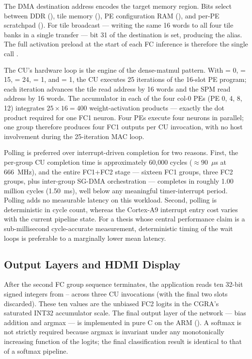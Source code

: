 The DMA destination address encodes the target memory region.
Bits \code{[31:28]} select between DDR (), tile memory
(), PE configuration RAM (), and per-PE scratchpad
(). For tile broadcast --- writing the same 16 words to all
four tile banks in a single transfer --- bit 31 of the destination is
set, producing the  alias. The full
activation preload at the start of each FC inference is therefore the
single call .

The CU's hardware loop is the engine of the dense-matmul pattern.
With  = 0,  = 15,
 = 24,  = 1, and
 = 1, the CU executes 25 iterations of the 16-slot
PE program; each iteration advances the tile read address by 16 words
and the SPM read address by 16 words. The accumulator in each of the
four col-0 PEs (PE 0, 4, 8, 12) integrates
$25 \times 16 = 400$ weight-activation products --- exactly the dot
product required for one FC1 neuron. Four PEs execute four neurons in
parallel; one group therefore produces four FC1 outputs per CU
invocation, with no host involvement during the 25-iteration MAC loop.

Polling is preferred over interrupt-driven completion for two reasons.
First, the per-group CU completion time is approximately 60{,}000 cycles
($\approx 90$~$\mu$s at 666~MHz), and the entire FC1+FC2 stage --- sixteen
FC1 groups, three FC2 groups, plus inter-group SG-DMA orchestration ---
completes in roughly 1.00 million cycles (1.50~ms), well below any
meaningful timer-interrupt period. Polling adds no measurable latency on
this workload. Second, polling is deterministic in cycle count, whereas
the Cortex-A9 interrupt entry cost varies with the current pipeline
state. For a thesis whose central performance claim is a sub-millisecond
cycle-accurate measurement, deterministic timing of the wait loops is
preferable to a marginally lower mean latency.

\subsection{Output Layers and HDMI Display}
\label{ssec:output}

After the second FC group sequence terminates, the application reads
ten 32-bit signed integers from --
across three CU invocations (with the final two slots discarded). These
ten values are the unbiased FC2 logits in the CGRA's saturated INT32
accumulator scale. The final output layer of the network --- bias
addition and argmax --- is implemented in pure C on the ARM
(). A softmax is not strictly required because argmax
is invariant under any monotonically increasing function of the
logits; the final classification result is identical to that of a
softmax pipeline.

